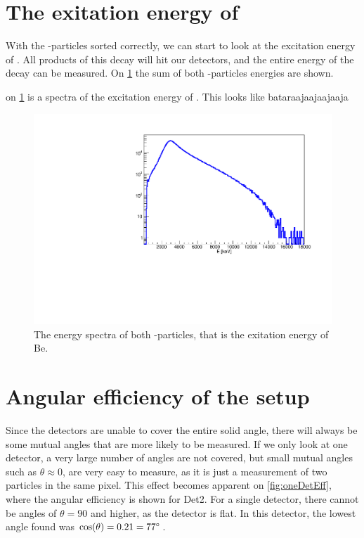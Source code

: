 \section{The exitation energy of \ber}
With the \al-particles sorted correctly, we can start to look at the excitation energy of \ber. All products of this decay will hit our detectors, and the entire energy of the decay can be measured. On \cref{fig:doubleAlpha} the sum of both \al-particles energies are shown.
 


on \cref{fig:doubleAlpha} is a spectra of the excitation energy of . This looks like bataraajaajaajaaja
\begin{figure}[h]
	\centering
	\includegraphics[width=\linewidth]{../figures/doubleAlpha.pdf}
	\caption{The energy spectra of both \al-particles, that is the exitation energy of \isotope[8]Be.}
	\label{fig:doubleAlpha}
\end{figure}

\section{Angular efficiency of the setup}
Since the detectors are unable to cover the entire solid angle, there will always be some mutual angles that are more likely to be measured. 
If we only look at one detector, a very large number of angles are not covered, but small mutual angles such as $\theta \approx 0$, are very easy to measure, as it is just a measurement of two particles in the same pixel. 
This effect becomes apparent on \cref{fig:oneDetEff}, where the angular efficiency is shown for Det2. For a single detector, there cannot be angles of $\theta = 90$ and higher, as the detector is flat. In this detector, the lowest angle found was $\cos(\theta) = 0.21 = 77\degree$.\\

